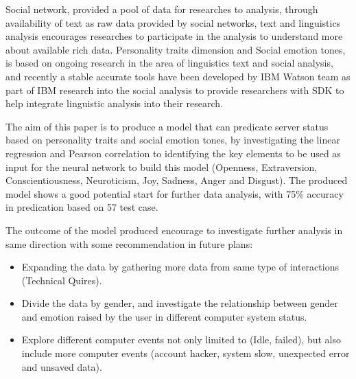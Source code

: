 \documentclass[graybox]{svmult}
\begin{document}
Social network, provided a pool of data for researches to analysis,
through availability of text as raw data provided by social networks,
text and linguistics analysis encourages researches to participate in
the analysis to understand more about available rich data. Personality
traits dimension and Social emotion tones, is based on ongoing
research in the area of linguistics text and social analysis, and
recently a stable accurate tools have been developed by IBM Watson
team as part of IBM research into the social analysis to provide
researchers with SDK to help integrate linguistic analysis into their
research.

The aim of this paper is to produce a model that can predicate server
status based on personality traits and social emotion tones, by
investigating the linear regression and Pearson correlation to
identifying the key elements to be used as input for the neural
network to build this model (Openness, Extraversion,
Conscientiousness, Neuroticism, Joy, Sadness, Anger and Disgust). The
produced model shows a good potential start for further data analysis,
with 75\% accuracy in predication based on 57 test case.

The outcome of the model produced encourage to investigate further
analysis in same direction with some recommendation in future plans:

\begin{itemize}
\item Expanding the data by gathering more data from same type of interactions (Technical Quires).
\item Divide the data by gender, and investigate the relationship
  between gender and emotion raised by the user in different computer
  system status.
\item Explore different computer events not only limited to (Idle,
  failed), but also include more computer events (account hacker,
  system slow, unexpected error and unsaved data).
\end{itemize}





\end{document}
